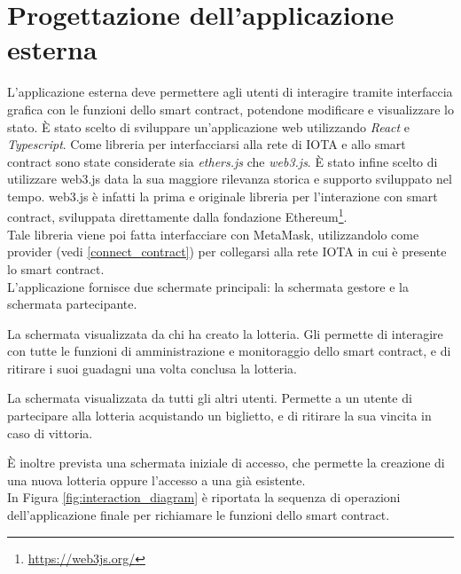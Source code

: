 \documentclass[12pt,a4paper,openright,twoside]{report}
\begin{document}
\section{Progettazione dell'applicazione esterna}
L'applicazione esterna deve permettere agli utenti di interagire tramite interfaccia grafica con le funzioni dello smart contract, potendone modificare e visualizzare lo stato. È stato scelto di sviluppare un'applicazione web utilizzando \textit{React} e \textit{Typescript}. Come libreria per interfacciarsi alla rete di IOTA e allo smart contract sono state considerate sia \textit{ethers.js} che \textit{web3.js}. È stato infine scelto di utilizzare web3.js data la sua maggiore rilevanza storica e supporto sviluppato nel tempo. web3.js è infatti la prima e originale libreria per l'interazione con smart contract, sviluppata direttamente dalla fondazione Ethereum\footnote{\url{https://web3js.org/}}.\\ 
Tale libreria viene poi fatta interfacciare con MetaMask, utilizzandolo come provider (vedi \ref{connect_contract}) per collegarsi alla rete IOTA in cui è presente lo smart contract.\\
L'applicazione fornisce due schermate principali: la schermata gestore e la schermata partecipante.
\begin{description}[font=$\bullet$\:\:,leftmargin=\parindent,labelindent=\parindent]
  \item[Schermata gestore] La schermata visualizzata da chi ha creato la lotteria. Gli permette di interagire con tutte le funzioni di amministrazione e monitoraggio dello smart contract, e di ritirare i suoi guadagni una volta conclusa la lotteria.
  \item[Schermata partecipante] La schermata visualizzata da tutti gli altri utenti. Permette a un utente di partecipare alla lotteria acquistando un biglietto, e di ritirare la sua vincita in caso di vittoria.
\end{description}
È inoltre prevista una schermata iniziale di accesso, che permette la creazione di una nuova lotteria oppure l'accesso a una già esistente.\\
In Figura \ref{fig:interaction_diagram} è riportata la sequenza di operazioni dell'applicazione finale per richiamare le funzioni dello smart contract.
\end{document}
